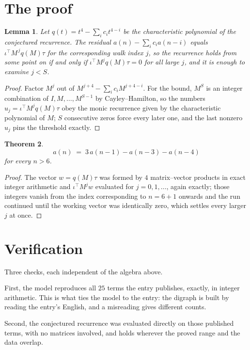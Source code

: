 \documentclass[11pt,a4paper]{article}
\theoremstyle{plain}
\newtheorem{theorem}{Theorem}
\newtheorem{lemma}[theorem]{Lemma}
\theoremstyle{definition}
\begin{document}
\section{The proof}

\begin{lemma}\label{lem:crit}
Let $q(t)=t^{4}-\sum_i c_it^{4-i}$ be the characteristic polynomial of the
conjectured recurrence. The residual $a(n)-\sum_ic_ia(n-i)$ equals
$\iota^{\!\top}M^{\,j}q(M)\tau$ for the corresponding walk index $j$, so the recurrence
holds from some point on if and only if $\iota^{\!\top}M^{j}q(M)\tau=0$ for all large $j$,
and it is enough to examine $j<S$.
\end{lemma}

\begin{proof}
Factor $M^{j}$ out of $M^{j+4}-\sum_ic_iM^{j+4-i}$. For the bound, $M^{S}$
is an integer combination of $I,M,\dots,M^{S-1}$ by Cayley--Hamilton, so the numbers
$u_j=\iota^{\!\top}M^{j}q(M)\tau$ obey the monic recurrence given by the characteristic
polynomial of $M$; $S$ consecutive zeros force every later one, and the last nonzero $u_j$
pins the threshold exactly.
\end{proof}

\begin{theorem}
\[
a(n)\;=\;3\,a(n-1) - a(n-3) - a(n-4)
\]
for every $n>6$.
\end{theorem}

\begin{proof}
The vector $w=q(M)\tau$ was formed by $4$ matrix--vector products in exact integer
arithmetic and $\iota^{\!\top}M^{j}w$ evaluated for $j=0,1,\dots$, again exactly; those
integers vanish from the index corresponding to $n=6+1$ onwards and the run continued
until the working vector was identically zero, which settles every larger $j$ at once.
\end{proof}

\section{Verification}

Three checks, each independent of the algebra above.

First, the model reproduces all $25$ terms the entry publishes, exactly, in integer
arithmetic. This is what ties the model to the entry: the digraph is built by reading the
entry's English, and a misreading gives different counts.

Second, the conjectured recurrence was evaluated directly on those published terms, with no
matrices involved, and holds wherever the proved range and the data overlap.
\end{document}
